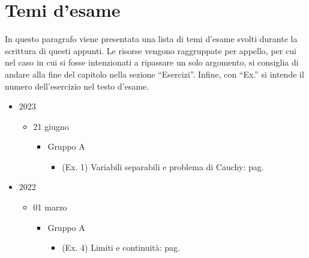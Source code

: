 \documentclass[a4paper]{article}
\newcommand{\dquotes}[1]{``#1''}
\begin{document}

	\newpage
	\newpage
	\newpage
	\section{Temi d'esame}

	In questo paragrafo viene presentata una lista di temi d'esame svolti durante la scrittura di questi appunti. Le risorse vengono raggruppate per appello, per cui nel caso in cui si fosse intenzionati a ripassare un solo argomento, si consiglia di andare alla fine del capitolo nella sezione \dquotes{Esercizi}. Infine, con \dquotes{Ex.} si intende il numero dell'esercizio nel testo d'esame.
	\begin{itemize}
		\item 2023
		\begin{itemize}
			\item 21 giugno
			\begin{itemize}
				\item Gruppo A
				\begin{itemize}
					\item (Ex. 1) Variabili separabili e problema di Cauchy: pag.\pageref{exam: esame 21 giugno 2023 - Gruppo A - 1 esercizio}
				\end{itemize}
			\end{itemize}
		\end{itemize}

		\item 2022
		\begin{itemize}
			\item 01 marzo
			\begin{itemize}
				\item Gruppo A
				\begin{itemize}
					\item (Ex. 4) Limiti e continuità: pag.\pageref{exam: esame 01 marzo 2022 - Gruppo A - 4 esercizio}
				\end{itemize}
			\end{itemize}
		\end{itemize}
	\end{itemize}
\end{document}

